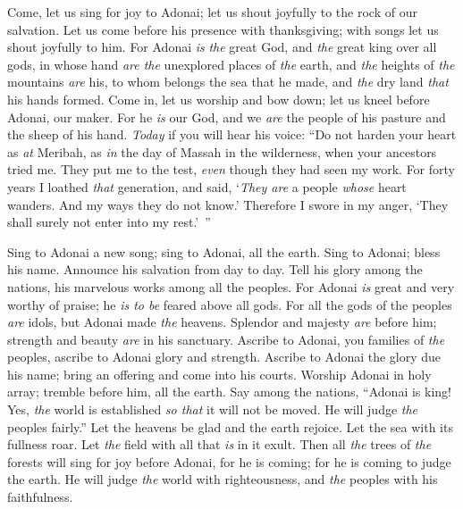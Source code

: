 \begin{biblechapter} %
 Come, let us sing for joy to Adonai; 
let us shout joyfully to the rock of our salvation.
\verse Let us come before his presence with thanksgiving; 
with songs let us shout joyfully to him.
\verse For Adonai \textit{is} \textit{the} great God, 
and \textit{the} great king over all gods,
\verse in whose hand \textit{are the} unexplored places of \textit{the} earth, 
and \textit{the} heights of \textit{the} mountains \textit{are} his,
\verse to whom belongs the sea that he made,  
and \textit{the} dry land \textit{that} his hands formed.
\verse Come in, let us worship and bow down; 
let us kneel before Adonai, our maker.
\verse For he \textit{is} our God, 
and we \textit{are} the people of his pasture 
and the sheep of his hand. 
\textit{Today} if you will hear his voice:
\verse “Do not harden your heart as \textit{at} Meribah, 
as \textit{in} the day of Massah in the wilderness,
\verse when your ancestors tried me. 
They put me to the test, 
\textit{even} though they had seen my work.
\verse For forty years I loathed \textit{that} generation, 
and said, ‘\textit{They are} a people \textit{whose} heart wanders. 
And my ways they do not know.’
\verse Therefore I swore in my anger, 
‘They shall surely not enter into my rest.’ ”
\end{biblechapter}

\begin{biblechapter} %
 Sing to Adonai a new song; 
sing to Adonai, all the earth.
\verse Sing to Adonai; bless his name. 
Announce his salvation from day to day.
\verse Tell his glory among the nations, 
his marvelous works among all the peoples.
\verse For Adonai \textit{is} great and very worthy of praise; 
he \textit{is to be} feared above all gods.
\verse For all the gods of the peoples \textit{are} idols, 
but Adonai made \textit{the} heavens.
\verse Splendor and majesty \textit{are} before him; 
strength and beauty \textit{are} in his sanctuary.
\verse Ascribe to Adonai, you families of \textit{the} peoples, 
ascribe to Adonai glory and strength.
\verse Ascribe to Adonai the glory due his name; 
bring an offering and come into his courts.
\verse Worship Adonai in holy array; 
tremble before him, all the earth.
\verse Say among the nations, “Adonai is king! 
Yes, \textit{the} world is established \textit{so that} it will not be moved. 
He will judge \textit{the} peoples fairly.”
\verse Let the heavens be glad and the earth rejoice. 
Let the sea with its fullness roar.
\verse Let \textit{the} field with all that \textit{is} in it exult. 
Then all \textit{the} trees of \textit{the} forests will sing for joy
\verse before Adonai, for he is coming; 
for he is coming to judge the earth. 
He will judge \textit{the} world with righteousness, 
and \textit{the} peoples with his faithfulness.
\end{biblechapter}

